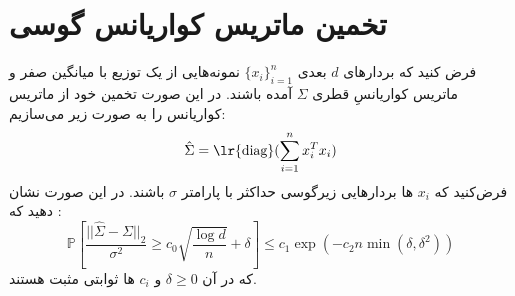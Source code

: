 
\section{تخمین ماتریس کواریانس گوسی}
فرض کنید که بردارهای 
$d$
بعدی 
$\{x_i\}_{i=1}^n$
نمونه‌هایی از یک توزیع با میانگین صفر و ماتریس کواریانسِ قطری 
$\Sigma$
آمده باشند. 
در این صورت تخمین خود از ماتریس کواریانس را به صورت زیر می‌سازیم:
$$\hat{\Sigma}= \text{\lr{diag}}( \sum_{i=1}^n x_i^T x_i)$$
فرض‌کنید که
$x_i$
ها
بردارهایی زیرگوسی حداکثر با پارامتر 
$\sigma$
باشند. در این صورت نشان دهید که :
$$\mathbb{P}[\frac{||\hat{\Sigma}- \Sigma||_2}{\sigma^2} \geq c_0 \sqrt{\frac{\log{d}}{n}} + \delta] \leq c_1 \exp{(-c_2 n \min(\delta, \delta^2))} $$
که در آن 
$\delta \geq 0$
و 
$c_i$
ها ثوابتی مثبت هستند.
